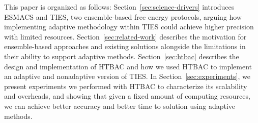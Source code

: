 
This paper is organized as follows: Section~\ref{sec:science-drivers}
introduces ESMACS and TIES, two ensemble-based free energy protocols, arguing
how implementing adaptive methodology within TIES could achieve higher
precision with limited resources. Section~\ref{sec:related-work} describes
the motivation for ensemble-based approaches and existing solutions alongside
the limitations in their ability to support adaptive methods.
Section~\ref{sec:htbac} describes the design and implementation of HTBAC and
how we used HTBAC to implement an adaptive and nonadaptive version of TIES.
In Section~\ref{sec:experiments}, we present experiments we performed with
HTBAC to characterize its scalability and overheads, and showing that given a
fixed amount of computing resources, we can achieve better accuracy and
better time to solution using adaptive methods.
